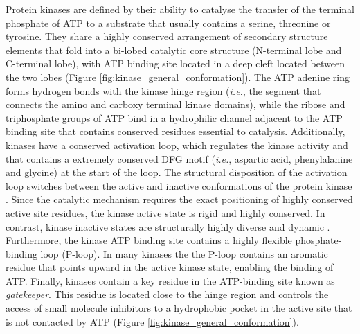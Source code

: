 \documentclass[11pt, b5paper,twoside]{tesi_upf}
\begin{document}
 \par Protein kinases are defined by their ability to catalyse the transfer of the terminal phosphate of ATP to a substrate that usually contains a serine, threonine or tyrosine. They share a highly conserved arrangement of secondary structure elements that fold into a bi-lobed catalytic core structure (N-terminal lobe and C-terminal lobe), with ATP binding site located in a deep cleft located between the two lobes \cite{Manning2002} (Figure \ref{fig:kinase_general_conformation}). The ATP adenine ring forms hydrogen bonds with the kinase hinge region (\textit{i.e.}, the segment that connects the amino and carboxy terminal kinase domains), while the ribose and triphosphate groups of ATP bind in a hydrophilic channel adjacent to the ATP binding site that contains conserved residues essential to catalysis. Additionally, kinases have a conserved activation loop, which regulates the kinase activity and that contains a extremely conserved DFG motif (\textit{i.e.}, aspartic acid, phenylalanine and glycine) at the start of the loop. The structural disposition of the activation loop switches between the active and inactive conformations of the protein kinase \cite{Manning2002}. Since the catalytic mechanism requires the exact positioning of highly conserved active site residues, the kinase active state is rigid and highly conserved. In contrast, kinase inactive states are structurally highly diverse and dynamic \cite{Muller2015}. Furthermore, the kinase ATP binding site contains a highly flexible phosphate-binding loop (P-loop). In many kinases the the P-loop contains an aromatic residue that points upward in the active kinase state, enabling the binding of ATP. Finally, kinases contain a key residue in the ATP-binding site known as \textit{gatekeeper}. This residue is located close to the hinge region and controls the access of small molecule inhibitors to a hydrophobic pocket in the active site that is not contacted by ATP \cite{Lui1998} (Figure \ref{fig:kinase_general_conformation}).  
 
\end{document}

